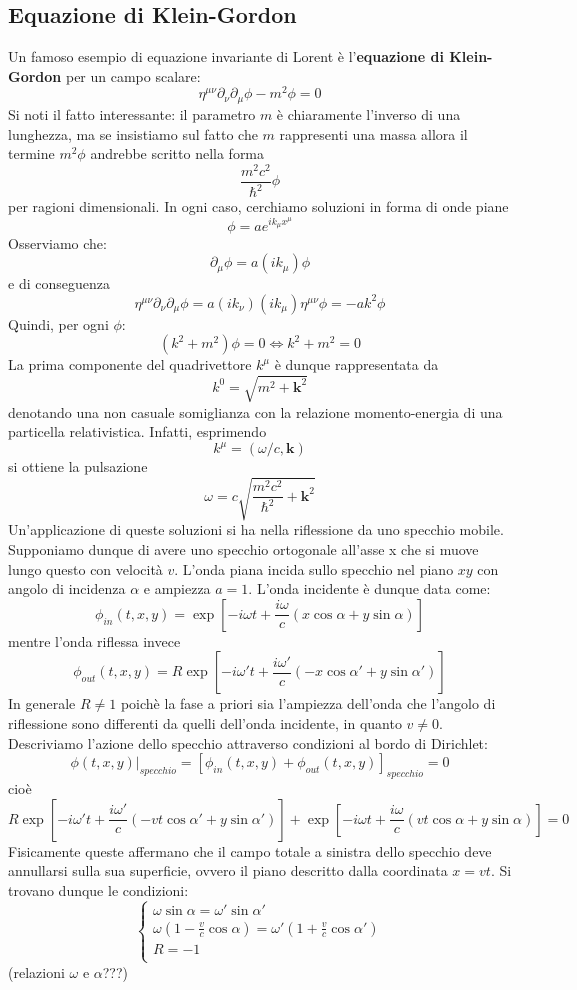 \documentclass[a4paper,11pt]{book}
\theoremstyle{plain}
\theoremstyle{definition}
\begin{document}
\subsection{Equazione di Klein-Gordon}
Un famoso esempio di equazione invariante di Lorent è l'\textbf{equazione di Klein-Gordon} per un campo scalare:
\[
\eta^{\mu\nu} \partial_{\nu}\partial_{\mu}\phi - m^2\phi = 0
\]
Si noti il fatto interessante: il parametro $m$ è chiaramente l'inverso di una lunghezza, ma 
se insistiamo sul fatto che $m$ rappresenti una massa allora il termine $m^2\phi$ andrebbe scritto nella 
forma
\[ 
\frac{m^2c^2}{\hbar^2}\phi
\]
per ragioni dimensionali. In ogni caso, cerchiamo soluzioni in forma di onde piane
\[
\phi = ae^{ik_{\mu}x^{\mu}}
\]
Osserviamo che:
\[
\partial_{\mu}\phi = a(ik_{\mu})\phi
\]
e di conseguenza
\[
\eta^{\mu\nu}\partial_{\nu}\partial_{\mu}\phi = a(ik_{\nu})(ik_{\mu})\eta^{\mu\nu}\phi = -ak^2\phi
\]
Quindi, per ogni $\phi$:
\[
(k^2+m^2)\phi = 0 \Longleftrightarrow k^2+m^2 = 0
\]
La prima componente del quadrivettore $k^{\mu}$ è dunque rappresentata da
\[
k^0 = \sqrt{m^2+\textbf{k}^2}
\]
denotando una non casuale somiglianza con la relazione momento-energia di una particella relativistica. Infatti, esprimendo
\[
k^{\mu} = (\omega/c,\textbf{k})
\]
si ottiene la pulsazione
\[
\omega = c\sqrt{\frac{m^2c^2}{\hbar^2}+\textbf{k}^2}
\]
Un'applicazione di queste soluzioni si ha nella riflessione da uno specchio mobile. Supponiamo dunque di avere uno specchio ortogonale all'asse x che si muove lungo questo con velocità $v$. L'onda piana incida sullo specchio nel piano $xy$ con angolo di incidenza $\alpha$ e ampiezza $a=1$. L'onda incidente è dunque data come:
\[
\phi_{in}(t,x,y) = \exp \left[ -i\omega t + \frac{i\omega}{c}(x\cos\alpha+y\sin\alpha) \right]
\]
mentre l'onda riflessa invece
\[
\phi_{out}(t,x,y) = R\exp \left[ -i\omega' t + \frac{i\omega'}{c}(-x\cos\alpha'+y\sin\alpha') \right]
\]
In generale $R\not=1$ poichè la fase a priori sia l'ampiezza dell'onda che l'angolo di riflessione sono differenti da quelli dell'onda incidente, in quanto $v\not=0$. Descriviamo l'azione dello specchio attraverso condizioni al bordo di Dirichlet:
\[
\left. \phi(t,x,y)\right|_{specchio}= \left[ \phi_{in}(t,x,y)+\phi_{out}(t,x,y) \right] _{specchio}=0
\]
cioè
\[
 R\exp \left[ -i\omega' t + \frac{i\omega'}{c}(-vt\cos\alpha'+y\sin\alpha') \right] + \exp \left[ -i\omega t + \frac{i\omega}{c}(vt\cos\alpha+y\sin\alpha) \right]=0
\]
Fisicamente queste affermano che il campo totale a sinistra dello specchio deve annullarsi sulla sua superficie, ovvero il piano descritto dalla coordinata $x=vt$. Si trovano dunque le condizioni:
\[
\begin{cases}
\omega \sin\alpha = \omega'\sin\alpha' \\
\omega \left( 1-\frac{v}{c}\cos\alpha \right) = \omega' \left( 1+\frac{v}{c}\cos\alpha' \right)\\
R=-1\\
\end{cases}
\]
(relazioni $\omega$ e $\alpha$???)
\end{document}
